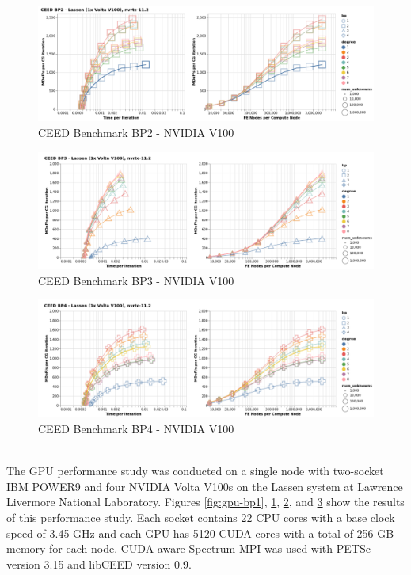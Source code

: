 \begin{figure}[ht!]
\includegraphics[width=.99\linewidth]{../img/cudaGenBP2Clip}
\caption{CEED Benchmark BP2 - NVIDIA V100}
\label{fig:gpu-bp2}
\end{figure}

\begin{figure}[ht!]
\includegraphics[width=.99\linewidth]{../img/cudaGenBP3Clip}
\caption{CEED Benchmark BP3 - NVIDIA V100}
\label{fig:gpu-bp3}
\end{figure}

\begin{figure}[ht!]
\includegraphics[width=.99\linewidth]{../img/cudaGenBP4Clip}
\caption{CEED Benchmark BP4 - NVIDIA V100}
\label{fig:gpu-bp4}
\end{figure}

~\\
The GPU performance study was conducted on a single node with two-socket IBM POWER9 and four NVIDIA Volta V100s on the Lassen system at Lawrence Livermore National Laboratory.
Figures \ref{fig:gpu-bp1}, \ref{fig:gpu-bp2}, \ref{fig:gpu-bp3}, and \ref{fig:gpu-bp4} show the results of this performance study.
Each socket contains 22 CPU cores with a base clock speed of 3.45 GHz and each GPU has 5120 CUDA cores with a total of 256 GB memory for each node.
CUDA-aware Spectrum MPI was used with PETSc \cite{petsc-user-ref} version 3.15 and libCEED \cite{libceed} version 0.9.

